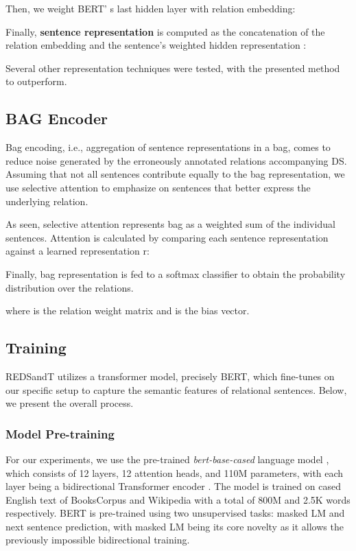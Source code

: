 \documentclass[11pt,a4paper]{article}
\begin{document}
Then, we weight BERT' s last hidden layer  with relation embedding:


Finally, \textbf{sentence representation}  is computed as the concatenation of the relation embedding  and the sentence's weighted hidden representation :


Several other representation techniques were tested, with the presented method to outperform.

\subsection{BAG Encoder}
Bag encoding, i.e., aggregation of sentence representations in a bag, comes to reduce noise generated by the erroneously annotated relations accompanying DS.
Assuming that not all sentences contribute equally to the bag representation, we use selective attention \cite{Lin2016} to emphasize on sentences that better express the underlying relation.

As seen, selective attention represents bag as a weighted sum of the individual sentences. Attention  is calculated by comparing each sentence representation against a learned representation r:


Finally, bag representation  is fed to a softmax classifier to obtain the probability distribution over the relations.

where  is the relation weight matrix and  is the bias vector. 

\subsection{Training}
REDSandT utilizes a transformer model, precisely BERT, which fine-tunes on our specific setup to capture the semantic features of relational sentences. Below, we present the overall process.

\subsubsection{Model Pre-training}
For our experiments, we use the pre-trained \textit{bert-base-cased} language model \cite{Devlin}, which consists of 12 layers, 12 attention heads, and 110M parameters, with each layer being a bidirectional Transformer encoder \cite{Vaswani2017}. The model is trained on cased English text of BooksCorpus and Wikipedia with a total of 800M and 2.5K words respectively. BERT is pre-trained using two unsupervised tasks: masked LM and next sentence prediction, with masked LM being its core novelty as it allows the previously impossible bidirectional training.
\end{document}
